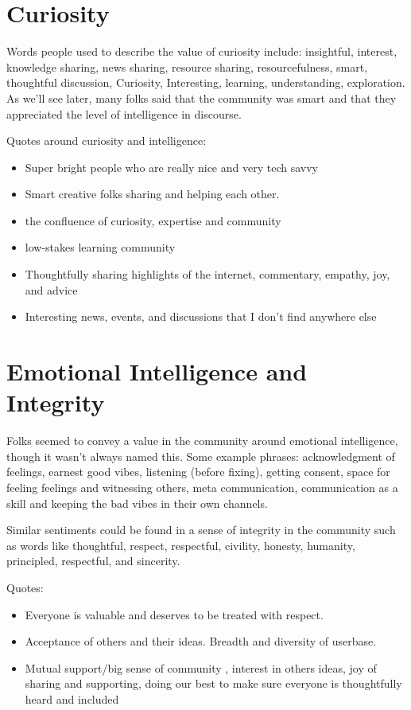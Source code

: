 \documentclass[
]{book}
\providecommand{\tightlist}{%
  \setlength{\itemsep}{0pt}\setlength{\parskip}{0pt}}
\begin{document}
\section{Curiosity}\label{curiosity}

Words people used to describe the value of curiosity include: insightful, interest, knowledge sharing, news sharing, resource sharing, resourcefulness, smart, thoughtful discussion, Curiosity, Interesting, learning, understanding, exploration. As we'll see later, many folks said that the community was smart and that they appreciated the level of intelligence in discourse.

Quotes around curiosity and intelligence:

\begin{itemize}
\tightlist
\item
  Super bright people who are really nice and very tech savvy
\item
  Smart creative folks sharing and helping each other.
\item
  the confluence of curiosity, expertise and community
\item
  low-stakes learning community
\item
  Thoughtfully sharing highlights of the internet, commentary, empathy, joy, and advice
\item
  Interesting news, events, and discussions that I don't find anywhere else
\end{itemize}

\section{Emotional Intelligence and Integrity}\label{emotional-intelligence-and-integrity}

Folks seemed to convey a value in the community around emotional intelligence, though it wasn't always named this. Some example phrases: acknowledgment of feelings, earnest good vibes, listening (before fixing), getting consent, space for feeling feelings and witnessing others, meta communication, communication as a skill and keeping the bad vibes in their own channels.

Similar sentiments could be found in a sense of integrity in the community such as words like thoughtful, respect, respectful, civility, honesty, humanity, principled, respectful, and sincerity.

Quotes:

\begin{itemize}
\tightlist
\item
  Everyone is valuable and deserves to be treated with respect.\\
\item
  Acceptance of others and their ideas. Breadth and diversity of userbase.
\item
  Mutual support/big sense of community , interest in others ideas, joy of sharing and supporting, doing our best to make sure everyone is thoughtfully heard and included
\end{itemize}
\end{document}
